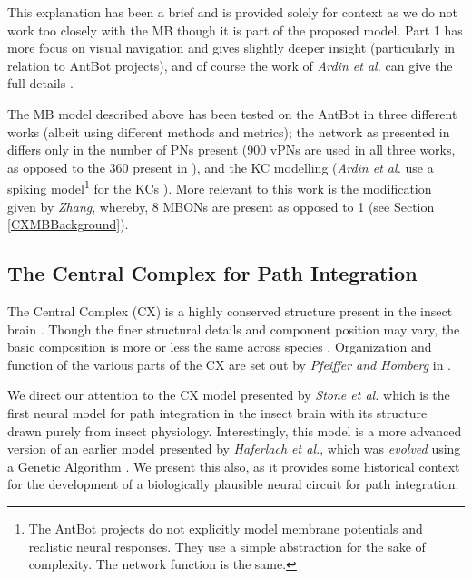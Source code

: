 \documentclass[a4paper,11pt,twoside,openright]{article}
\begin{document}
This explanation has been a brief and is provided solely for context
as we do not work too closely with the MB though it is part of the
proposed model. Part 1 has more focus on visual navigation and gives
slightly deeper insight \cite{Mitchell2018} (particularly in relation
to AntBot projects), and of course the work of \textit{Ardin et al.}
can give the full details \cite{Ardin2016}.
\newline
\par

The MB model described above has been tested on the AntBot in three
different works (albeit using different methods and metrics); the
network as presented in \cite{Eberding2016, Zhang2017, Mitchell2018}
differs only in the number of PNs present (900 vPNs are used in all
three works, as opposed to the 360 present in \cite{Ardin2016}), and
the KC modelling (\textit{Ardin et al.} use a spiking
model\footnote{The AntBot projects do not explicitly model membrane
  potentials and realistic neural responses.  They use a simple
  abstraction for the sake of complexity. The network function is the
  same.} for the KCs \cite{Ardin2016}). More relevant to this work is
the modification given by \textit{Zhang}, whereby, 8 MBONs
are present as opposed to 1 (see Section \ref{CXMBBackground}).
\newline
\par

\subsection{ The Central Complex for Path Integration } \label{CXBackground}
The Central Complex (CX) is a highly conserved structure present in the insect
brain \cite{Pfeiffer2014, Stone2017}. Though the finer structural details and
component position may vary, the basic composition is more or less the same
across species \cite{Pfeiffer2014}. Organization and function of the
various parts of the CX are set out by \textit{Pfeiffer and Homberg} in
\cite{Pfeiffer2014}.
\newline
\par

We direct our attention to the CX model presented by \textit{Stone et
  al.}  which is the first neural model for path integration in the
insect brain with its structure drawn purely from insect
physiology. Interestingly, this model is a more advanced version of an
earlier model presented by \textit{Haferlach et al.}, which was
\textit{evolved} using a Genetic Algorithm \cite{Haferlach2007}. We
present this also, as it provides some historical context for the
development of a biologically plausible neural circuit for path
integration.
\end{document}
